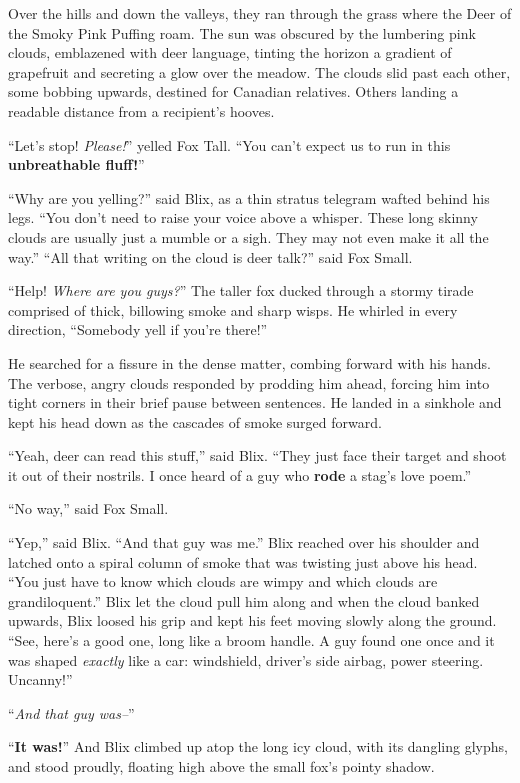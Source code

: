 \documentclass[10pt,twoside]{report}
\begin{document}
Over the hills and down the valleys, they ran through the grass where
the Deer of the Smoky Pink Puffing roam.  The sun was obscured by the
lumbering pink clouds, emblazened with deer language, tinting the
horizon a gradient of grapefruit and secreting a glow over the meadow.
The clouds slid past each other, some bobbing upwards, destined for
Canadian relatives.  Others landing a readable distance from a
recipient's hooves.

``Let's stop!  {\em Please!}'' yelled Fox Tall.  ``You can't expect us
to run in this {\bf unbreathable fluff!}''

``Why are you yelling?'' said Blix, as a thin stratus telegram wafted
behind his legs.  ``You don't need to raise your voice above a
whisper.  These long skinny clouds are usually just a mumble or a
sigh.  They may not even make it all the way.''  ``All that writing on
the cloud is deer talk?'' said Fox Small.

``Help!  {\em Where are you guys?}''  The taller fox ducked through a
stormy tirade comprised of thick, billowing smoke and sharp wisps.  He
whirled in every direction, ``Somebody yell if you're there!''

He searched for a fissure in the dense matter, combing forward with
his hands.  The verbose, angry clouds responded by prodding him ahead,
forcing him into tight corners in their brief pause between sentences.
He landed in a sinkhole and kept his head down as the cascades of
smoke surged forward.

``Yeah, deer can read this stuff,'' said Blix.  ``They just face their
target and shoot it out of their nostrils.  I once heard of a guy who
{\bf rode} a stag's love poem.''

``No way,'' said Fox Small.

``Yep,'' said Blix.  ``And that guy was me.''  Blix reached over his
shoulder and latched onto a spiral column of smoke that was twisting
just above his head.  ``You just have to know which clouds are wimpy
and which clouds are grandiloquent.''  Blix let the cloud pull him
along and when the cloud banked upwards, Blix loosed his grip and kept
his feet moving slowly along the ground.  ``See, here's a good one,
long like a broom handle.  A guy found one once and it was shaped {\em
  exactly} like a car: windshield, driver's side airbag, power
steering. Uncanny!''

``{\em And that guy was--}''

``{\bf It was!}''  And Blix climbed up atop the long icy cloud, with
its dangling glyphs, and stood proudly, floating high above the small
fox's pointy shadow.
\end{document}
